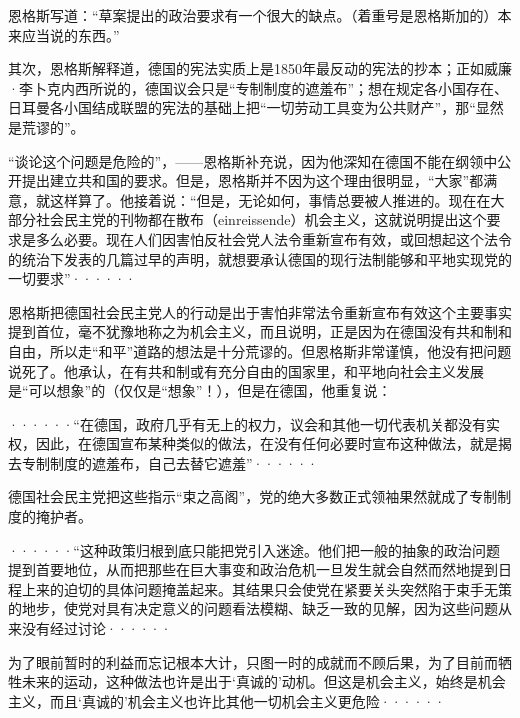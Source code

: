 \pskip
\small
\leftskip=10mm

恩格斯写道：“草案提出的政治要求有一个很大的缺点。（着重号是恩格斯加的）本来应当说的东西。”

\normalsize
\leftskip=0mm
\pskip

其次，恩格斯解释道，德国的宪法实质上是1850年最反动的宪法的抄本；正如威廉·李卜克内西所说的，德国议会只是“专制制度的遮羞布”；想在规定各小国存在、日耳曼各小国结成联盟的宪法的基础上把“一切劳动工具变为公共财产”，那“显然是荒谬的”。

\pskip
\small
\leftskip=10mm

“谈论这个问题是危险的”，——恩格斯补充说，因为他深知在德国不能在纲领中公开提出建立共和国的要求。但是，恩格斯并不因为这个理由很明显，“大家”都满意，就这样算了。他接着说：“但是，无论如何，事情总要被人推进的。现在在大部分社会民主党的刊物都在散布（einreissende）机会主义，这就说明提出这个要求是多么必要。现在人们因害怕反社会党人法令重新宣布有效，或回想起这个法令的统治下发表的几篇过早的声明，就想要承认德国的现行法制能够和平地实现党的一切要求”······

\normalsize
\leftskip=0mm
\pskip

恩格斯把德国社会民主党人的行动是出于害怕非常法令重新宣布有效这个主要事实提到首位，毫不犹豫地称之为机会主义，而且说明，正是因为在德国没有共和制和自由，所以走“和平”道路的想法是十分荒谬的。但恩格斯非常谨慎，他没有把问题说死了。他承认，在有共和制或有充分自由的国家里，和平地向社会主义发展是“可以想象”的（仅仅是“想象”！），但是在德国，他重复说：

\pskip
\small
\leftskip=10mm

······“在德国，政府几乎有无上的权力，议会和其他一切代表机关都没有实权，因此，在德国宣布某种类似的做法，在没有任何必要时宣布这种做法，就是揭去专制制度的遮羞布，自己去替它遮羞”······

\normalsize
\leftskip=0mm
\pskip

德国社会民主党把这些指示“束之高阁”，党的绝大多数正式领袖果然就成了专制制度的掩护者。

\pskip
\small
\leftskip=10mm

······“这种政策归根到底只能把党引入迷途。他们把一般的抽象的政治问题提到首要地位，从而把那些在巨大事变和政治危机一旦发生就会自然而然地提到日程上来的迫切的具体问题掩盖起来。其结果只会使党在紧要关头突然陷于束手无策的地步，使党对具有决定意义的问题看法模糊、缺乏一致的见解，因为这些问题从来没有经过讨论······

为了眼前暂时的利益而忘记根本大计，只图一时的成就而不顾后果，为了目前而牺牲未来的运动，这种做法也许是出于‘真诚的’动机。但这是机会主义，始终是机会主义，而且‘真诚的’机会主义也许比其他一切机会主义更危险······

